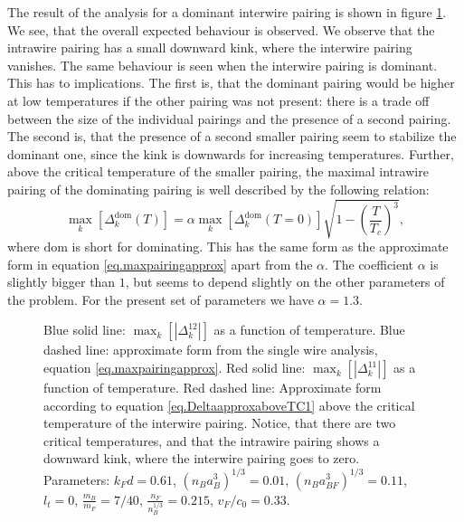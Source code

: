 The result of the analysis for a dominant interwire pairing is shown in figure \ref{fig.maximalpairingsTdepend_2wires}. We see, that the overall expected behaviour is observed. We observe that the intrawire pairing has a small downward kink, where the interwire pairing vanishes. The same behaviour is seen when the interwire pairing is dominant. This has to implications. The first is, that the dominant pairing would be higher at low temperatures if the other pairing was not present: there is a trade off between the size of the individual pairings and the presence of a second pairing. The second is, that the presence of a second smaller pairing seem to stabilize the dominant one, since the kink is downwards for increasing temperatures. Further, above the critical temperature of the smaller pairing, the maximal intrawire pairing of the dominating pairing is well described by the following relation:
\begin{equation}
\max_k[\Delta^{\text{dom}}_k(T)] = \alpha \max_k[\Delta^{\text{dom}}_k(T = 0)] \sqrt{1 - \left(\frac{T}{T_c}\right)^3},
\label{eq.DeltaapproxaboveTC1}
\end{equation}
where $\text{dom}$ is short for dominating. This has the same form as the approximate form in equation \eqref{eq.maxpairingapprox} apart from the $\alpha$. The coefficient $\alpha$ is slightly bigger than $1$, but seems to depend slightly on the other parameters of the problem. For the present set of parameters we have $\alpha = 1.3$. 

\begin{figure} 
\begin{center}  
  
\caption{Blue solid line: $\max_k[|\Delta^{12}_k|]$ as a function of temperature. Blue dashed line: approximate form from the single wire analysis, equation \eqref{eq.maxpairingapprox}. Red solid line: $\max_k[|\Delta^{11}_k|]$ as a function of temperature. Red dashed line: Approximate form according to equation \eqref{eq.DeltaapproxaboveTC1} above the critical temperature of the interwire pairing. Notice, that there are two critical temperatures, and that the intrawire pairing shows a downward kink, where the interwire pairing goes to zero. Parameters: $k_Fd = 0.61$, $(n_Ba_B^3)^{1/3} = 0.01$, $(n_Ba_{BF}^3)^{1/3} = 0.11$, $l_t = 0$, $\frac{m_B}{m_F} = 7/40$, $\frac{n_F}{n_B^{1/3}} = 0.215$, $v_F/c_0 = 0.33$.}  
\label{fig.maximalpairingsTdepend_2wires}  
\end{center}    
\end{figure} 
